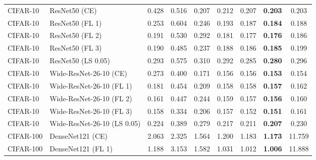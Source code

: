 \begin{table}[h!]
{\begin{tabular}{llccccccc}
    CIFAR-10 &               ResNet50 (CE) &         0.428 &        0.516 &    0.207 &                  0.212 &                  0.207 & \textbf{0.203} &                  0.203 \\
    CIFAR-10 &             ResNet50 (FL 1) &         0.253 &        0.604 &    0.246 &                  0.193 &                  0.187 & \textbf{0.184} &                  0.188 \\
    CIFAR-10 &             ResNet50 (FL 2) &         0.191 &        0.530 &    0.292 &                  0.181 &                  0.177 & \textbf{0.176} &                  0.186 \\
    CIFAR-10 &             ResNet50 (FL 3) &         0.190 &        0.485 &    0.237 &                  0.188 &                  0.186 & \textbf{0.185} &                  0.199 \\
    CIFAR-10 &          ResNet50 (LS 0.05) &         0.293 &        0.575 &    0.310 &                  0.292 &                  0.285 & \textbf{0.280} &                  0.296 \\
    CIFAR-10 &      Wide-ResNet-26-10 (CE) &         0.273 &        0.400 &    0.171 &                  0.156 &                  0.156 & \textbf{0.153} &                  0.154 \\
    CIFAR-10 &    Wide-ResNet-26-10 (FL 1) &         0.181 &        0.454 &    0.209 &                  0.158 &                  0.158 & \textbf{0.157} &                  0.162 \\
    CIFAR-10 &    Wide-ResNet-26-10 (FL 2) &         0.161 &        0.447 &    0.244 &                  0.159 &                  0.157 & \textbf{0.156} &                  0.160 \\
    CIFAR-10 &    Wide-ResNet-26-10 (FL 3) &         0.158 &        0.334 &    0.206 &                  0.157 &                  0.152 & \textbf{0.151} &                  0.161 \\
    CIFAR-10 & Wide-ResNet-26-10 (LS 0.05) &         0.224 &        0.389 &    0.279 &                  0.217 &                  0.211 & \textbf{0.207} &                  0.230 \\
   CIFAR-100 &            DenseNet121 (CE) &         2.063 &        2.325 &    1.564 &                  1.200 &                  1.183 & \textbf{1.173} &                 11.759 \\
   CIFAR-100 &          DenseNet121 (FL 1) &         1.188 &        3.153 &    1.582 &                  1.031 &                  1.012 & \textbf{1.006} &                 11.888 \\

\end{tabular}}
\end{table}
